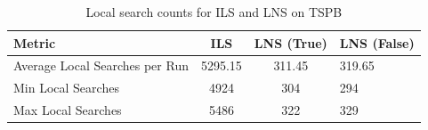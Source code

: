 \begin{table}[h!]
\centering
\begin{tabular}{lcc}
\hline
Metric & ILS & LNS (True) & LNS (False)\\
\hline
Average Local Searches per Run & 5295.15 & 311.45 & 319.65 \\
Min Local Searches & 4924 & 304 & 294 \\
Max Local Searches & 5486 & 322 & 329 \\
\hline
\end{tabular}
\caption{Local search counts for ILS and LNS on TSPB}
\label{tab:TSPB_local_search_counts}
\end{table}
